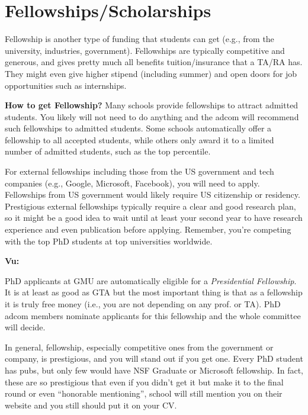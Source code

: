 \documentclass[oneside,11pt,dvipsnames]{book}
\newenvironment{commentbox}[1][]{
  \small
  \begin{mybox}
    {\small \textbf{#1}}
  }{
  \end{mybox}
}
\begin{document}
\section{Fellowships/Scholarships}\label{sec:fellowships}

Fellowship is another type of funding that students can get (e.g., from the university, industries, government).
Fellowships are typically competitive and generous, and gives pretty much all benefits tuition/insurance that a TA/RA has.  They might even give higher stipend (including summer) and open doors for job opportunities such as internships.

\textbf{How to get Fellowship?}   Many schools provide fellowships to attract admitted students. You likely will not need to do anything and the adcom will recommend such fellowships to admitted students. Some schools automatically offer a fellowship to all accepted students, while others only award it to a limited number of admitted students, such as the top percentile.

For external fellowships including those from the US government and tech companies (e.g., Google, Microsoft, Facebook), you will need to apply.  Fellowships from US government would likely require US citizenship or residency. %
Prestigious external fellowships typically require a clear and good research plan, so it might be a good idea to wait until at least your second year to have research experience and even publication before applying. Remember, you're competing with the top PhD students at top universities worldwide.


\begin{commentbox}[Vu:]
  PhD applicants at GMU are automatically eligible for a \emph{Presidential Fellowship}.  It is at least as good as GTA but the most important thing is that as a fellowship it is truly free money (i.e., you are not depending on any prof. or TA).  PhD adcom members nominate applicants for this fellowship and the whole committee will decide.
\end{commentbox}

In general, fellowship, especially competitive ones from the government or company, is prestigious, and you will stand out if you get one.  Every PhD student has pubs, but only few  would have NSF Graduate or Microsoft fellowship. In fact, these are so prestigious that even if you didn't get it but make it to the final round or even ``honorable mentioning'', school will still mention you on their website and you still should put it on your CV.
\end{document}
